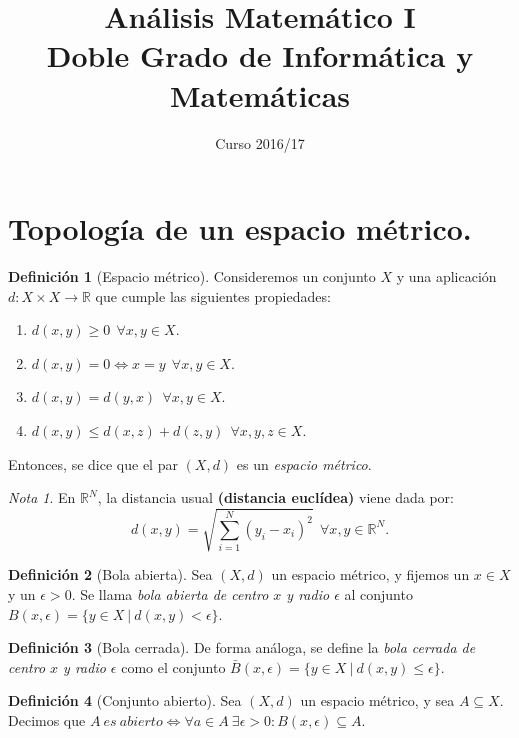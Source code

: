 \documentclass[11pt,a4paper, titlepage]{article}
\title{\textbf{Análisis Matemático I}\\ Doble Grado de Informática y Matemáticas}
\author{}
\date{\vspace{-4em}Curso 2016/17}
\theoremstyle{plain}
\theoremstyle{remark}
\newtheorem*{nota}{Nota}
\theoremstyle{definition}
\newtheorem*{ndef}{Definición}
\newenvironment{nlist}
  {\begin{enumerate}\renewcommand\labelenumi{(\emph{\roman{enumi})}}}
  {\end{enumerate}}
\begin{document}
\maketitle

\section{Topología de un espacio métrico.}


\begin{ndef}[Espacio métrico]
Consideremos un conjunto $X$ y una aplicación \mbox{$d:X\times X \longrightarrow \mathbb{R}$} que cumple las siguientes propiedades:
\begin{nlist}
\item $d(x,y) \ge 0\ \ \forall x,y \in X$.
\item $d(x,y) = 0 \iff x = y\ \ \forall x,y \in X$.
\item $d(x,y) = d(y,x)\ \ \forall x,y \in X$.
\item $d(x,y) \leq d(x,z) + d(z,y)\ \ \forall x,y,z \in X$.
\end{nlist}
Entonces, se dice que el par $(X,d)$ es un \emph{espacio métrico}.
\end{ndef}



\begin{nota}
En $\mathbb{R}^N$, la distancia usual \textbf{(distancia euclídea)} viene dada por: $$d(x,y) = \sqrt{\sum_{i=1}^N (y_i - x_i)^2}\ \ \forall x,y\in \mathbb{R}^N.$$
\end{nota}


\begin{ndef}[Bola abierta]
Sea $(X,d)$ un espacio métrico, y fijemos un $x\in X$ y un $\epsilon > 0$. Se llama \emph{bola abierta de centro $x$ y radio $\epsilon$} al conjunto $B(x,\epsilon) = \{ y\in X \ | \ d(x,y)<\epsilon\}$.
\end{ndef}



\begin{ndef}[Bola cerrada]
De forma análoga, se define la \emph{bola cerrada de centro $x$ y radio $\epsilon$} como el conjunto $\bar{B}(x,\epsilon) = \{y\in X \ | \ d(x,y)\leq \epsilon \}$.
	
\end{ndef}



\begin{ndef}[Conjunto abierto]
Sea $(X,d)$ un espacio métrico, y sea $A\subseteq X$. Decimos que \mbox{$A\ es\ abierto \iff \forall a \in A\ \exists \epsilon > 0: B(x,\epsilon) \subseteq A$}.	
\end{ndef}
\end{document}
